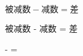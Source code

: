 \documentclass[nofonts]{ctexbook}
\begin{document}
$\text{被减数} - \text{减数} = \text{差}$

被减数 - 减数 = 差

 -  = 
\end{document}
